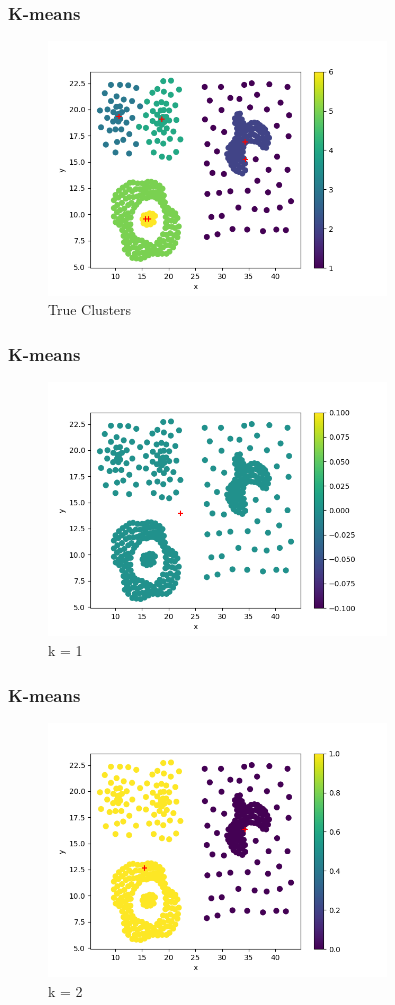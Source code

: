 \documentclass[xcolor={usenames,dvipsnames}, 
	hyperref={
	colorlinks=true, 						%
	linkcolor=black, 						%
	urlcolor=black,							%
	citecolor=black,						%
	pdfpagelabels=false,
	},
	ignorenonframetext,			%
	compress					%
]{beamer}
\begin{document}
\begin{frame}
   \frametitle{K-means}
\begin{figure}[ht!]
\caption{True Clusters}
\centering
\includegraphics[width=0.8\textwidth]{plots/k_mean_0.png}
\end{figure}
\end{frame}

\begin{frame}
   \frametitle{K-means}
\begin{figure}[ht!]
\caption{k = 1}
\centering
\includegraphics[width=0.8\textwidth]{plots/k_mean_1.png}
\end{figure}
\end{frame}

\begin{frame}
   \frametitle{K-means}
\begin{figure}[ht!]
\caption{k = 2}
\centering
\includegraphics[width=0.8\textwidth]{plots/k_mean_2.png}
\end{figure}
\end{frame}
\end{document}
